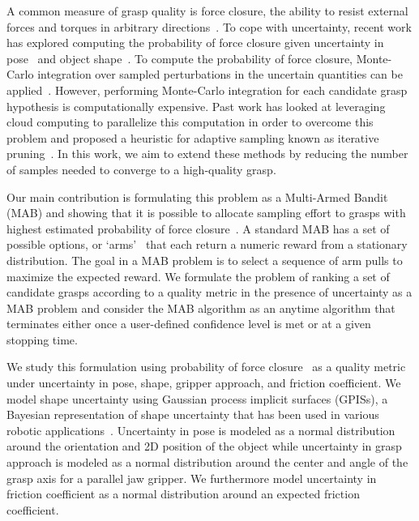 \documentclass[10pt, conference]{ieeeconf}      %
\begin{document}
A common measure of grasp quality is force closure, the ability to resist external forces and torques in arbitrary directions~\cite{li1988task}. To cope with uncertainty, recent work has explored computing the probability of force closure given uncertainty in pose~\cite{christopoulos2007handling, kim2012physically, weisz2012pose} and object shape~\cite{kehoe2012estimating, mahler2015gp}.
To compute the probability of force closure, Monte-Carlo integration over sampled perturbations in the uncertain
quantities can be applied~\cite{christopoulos2007handling,kehoe2012toward, kim2012physically, weisz2012pose}. However,
performing Monte-Carlo integration for each candidate grasp hypothesis is computationally expensive.  Past work has
looked at leveraging cloud computing to parallelize this computation in order to overcome this problem and proposed a heuristic for adaptive sampling known as iterative pruning~\cite{kehoe2012estimating,kehoe2012toward,kehoe2015survey}.
In this work, we aim to extend these methods by reducing the number of samples needed to converge to a high-quality grasp.  

Our main contribution is formulating this problem as a Multi-Armed Bandit (MAB) and showing that it is possible to
allocate sampling effort to grasps with highest estimated probability of force closure~\cite{barto1998reinforcement,
lai1985asymptotically, robbins1985some}. A standard MAB has a set of possible options, or
`arms'~\cite{barto1998reinforcement} that each return a numeric reward from a stationary distribution. The goal in a
MAB problem is to  select a sequence of arm pulls to maximize the expected reward. We formulate the problem of ranking a
set of candidate grasps according to a quality metric in the presence of uncertainty as a MAB problem and consider the
MAB algorithm as an anytime algorithm that terminates either once a user-defined confidence level is met or at a given stopping time. 

We study this formulation using probability of force closure~\cite{christopoulos2007handling, weisz2012pose, kehoe2012toward} as a quality metric under uncertainty in pose, shape, gripper approach, and friction coefficient. 
We model shape uncertainty using Gaussian process implicit surfaces (GPISs), a Bayesian representation of shape uncertainty that has been used in various robotic applications~\cite{dragiev2011, hollinger2013}. 
Uncertainty in pose is modeled as a normal distribution around the orientation and 2D position of the object while
uncertainty in grasp approach is modeled as a normal distribution around the center and angle of the grasp axis for a
parallel jaw gripper. We furthermore model uncertainty in friction coefficient as a normal distribution around an expected friction coefficient.
\end{document}
